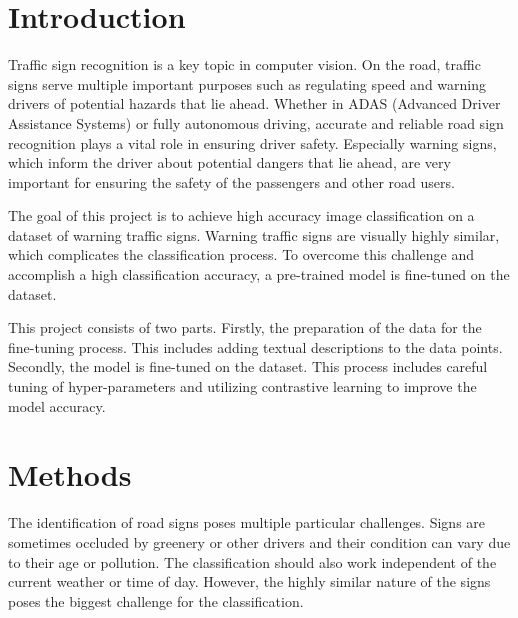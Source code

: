 \documentclass{article}
\begin{document}
\section{Introduction}
Traffic sign recognition is a key topic in computer vision. On the road, traffic signs serve multiple important purposes such as regulating speed and warning drivers of potential hazards that lie ahead. Whether in ADAS (Advanced Driver Assistance Systems) or fully autonomous driving, accurate and reliable road sign recognition plays a vital role in ensuring driver safety. Especially warning signs, which inform the driver about potential dangers that lie ahead, are very important for ensuring the safety of the passengers and other road users.

The goal of this project is to achieve high accuracy image classification on a dataset of warning traffic signs. Warning traffic signs are visually highly similar, which complicates the classification process. To overcome this challenge and accomplish a high classification accuracy, a pre-trained model is fine-tuned on the dataset.

This project consists of two parts. Firstly, the preparation of the data for the fine-tuning process. This includes adding textual descriptions to the data points. Secondly, the model is fine-tuned on the dataset. This process includes careful tuning of hyper-parameters and utilizing contrastive learning to improve the model accuracy.


\section{Methods}
The identification of road signs poses multiple particular challenges. Signs are sometimes occluded by greenery or other drivers and their condition can vary due to their age or pollution. The classification should also work independent of the current weather or time of day. However, the highly similar nature of the signs poses the biggest challenge for the classification.
\end{document}
